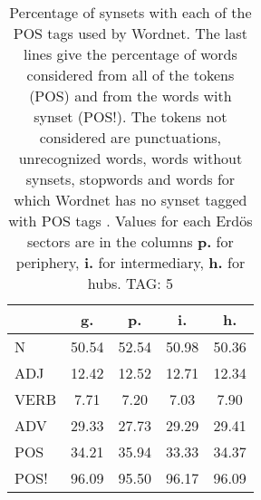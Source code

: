 \begin{table}[h!]
\begin{center}
\begin{tabular}{| l | c | c | c | c |}\hline
 & g. & p. & i. & h. \\\hline
N & 50.54  & 52.54  & 50.98  & 50.36 \\\hline
ADJ & 12.42  & 12.52  & 12.71  & 12.34 \\\hline
VERB & 7.71  & 7.20  & 7.03  & 7.90 \\\hline
ADV & 29.33  & 27.73  & 29.29  & 29.41 \\\hline
POS & 34.21  & 35.94  & 33.33  & 34.37 \\\hline
POS! & 96.09  & 95.50  & 96.17  & 96.09 \\\hline
\end{tabular}
\caption{Percentage of synsets with each of the POS tags used by Wordnet. The last lines give the percentage of words considered from all of the tokens (POS) and from the words with synset (POS!). The tokens not considered are punctuations, unrecognized words, words without synsets, stopwords and words for which Wordnet has no synset  tagged with POS tags . Values for each Erd\"os sectors are in the columns {{\bf p.}} for periphery, {{\bf i.}} for intermediary, {{\bf h.}} for hubs. TAG: 5}
\end{center}
\end{table}